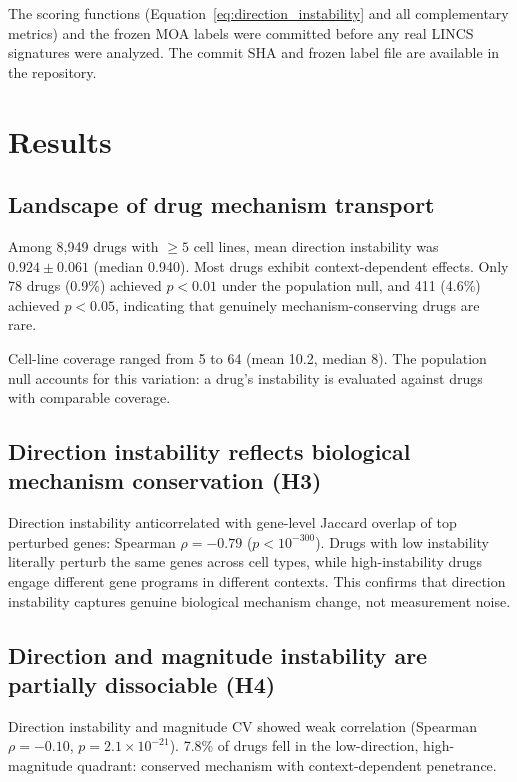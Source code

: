 \documentclass[11pt]{article}
\begin{document}
The scoring functions (Equation~\ref{eq:direction_instability} and all
complementary metrics) and the frozen MOA labels were committed before any
real LINCS signatures were analyzed. The commit SHA and frozen label file
are available in the repository.

\section{Results}

\subsection{Landscape of drug mechanism transport}

Among 8{,}949 drugs with $\geq5$ cell lines, mean direction instability
was $0.924 \pm 0.061$ (median 0.940). Most drugs exhibit context-dependent
effects. Only 78 drugs (0.9\%) achieved $p < 0.01$ under the population
null, and 411 (4.6\%) achieved $p < 0.05$, indicating that genuinely
mechanism-conserving drugs are rare.

Cell-line coverage ranged from 5 to 64 (mean 10.2, median 8). The
population null accounts for this variation: a drug's instability is
evaluated against drugs with comparable coverage.

\subsection{Direction instability reflects biological mechanism conservation (H3)}

Direction instability anticorrelated with gene-level Jaccard overlap of
top perturbed genes: Spearman $\rho = -0.79$ ($p < 10^{-300}$). Drugs with
low instability literally perturb the same genes across cell types, while
high-instability drugs engage different gene programs in different contexts.
This confirms that direction instability captures genuine biological
mechanism change, not measurement noise.

\subsection{Direction and magnitude instability are partially dissociable (H4)}

Direction instability and magnitude CV showed weak correlation (Spearman
$\rho = -0.10$, $p = 2.1 \times 10^{-21}$). 7.8\% of drugs fell in
the low-direction, high-magnitude quadrant: conserved mechanism with
context-dependent penetrance.
\end{document}
